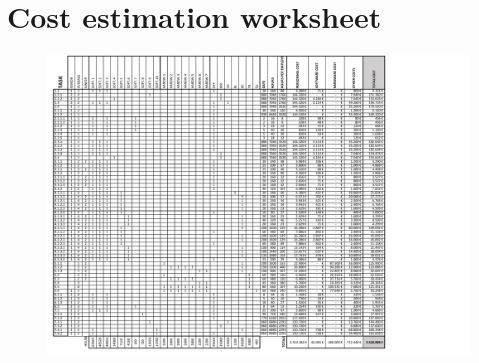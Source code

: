 

\section{Cost estimation worksheet}

	\begin{figure}[H]
	\centering
		\includegraphics[page=1,width=1.3\textwidth]{./Task8/Coststask8_v2.pdf}
	\end{figure}

